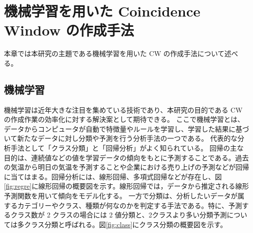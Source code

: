 \chapter{機械学習を用いた Coincidence Window の作成手法}\label{chapter4}
本章では本研究の主題である機械学習を用いた CW の作成手法について述べる。

\section{機械学習}\label{回帰分析}
機械学習は近年大きな注目を集めている技術であり、本研究の目的である CW の作成作業の効率化に対する解決案として期待できる。
ここで機械学習とは、データからコンピュータが自動で特徴量やルールを学習し、学習した結果に基づいて新たなデータに対し分類や予測を行う分析手法の一つである。
代表的な分析手法として「クラス分類」と「回帰分析」がよく知られている。
回帰の主な目的は、連続値などの値を学習データの傾向をもとに予測することである。過去の気温から明日の気温を予測することや企業における売り上げの予測などが回帰に当てはまる。回帰分析には、線形回帰、多項式回帰などが存在し、図\ref{fig:regre}に線形回帰の概要図を示す。線形回帰では，データから推定される線形予測関数を用いて傾向をモデル化する。
一方で分類は、分析したいデータが属するカテゴリーやクラス、種類が何なのかを判定する手法である。特に、予測するクラス数が 2 クラスの場合には 2 値分類と、2クラスより多い分類予測については多クラス分類と呼ばれる。図\ref{fig:class}にクラス分類の概要図を示す。
